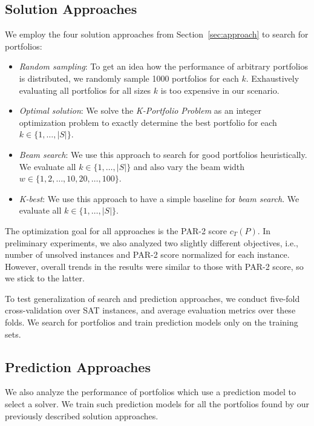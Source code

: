 \documentclass[conference]{IEEEtran}
\begin{document}
\subsection{Solution Approaches}

We employ the four solution approaches from Section~\ref{sec:approach} to search for portfolios:

\begin{itemize}
	\item \emph{Random sampling}:
	To get an idea how the performance of arbitrary portfolios is distributed, we randomly sample 1000 portfolios for each $k$.
	Exhaustively evaluating all portfolios for all sizes $k$ is too expensive in our scenario.
	\item \emph{Optimal solution}:
	We solve the \emph{K-Portfolio Problem} as an integer optimization problem to exactly determine the best portfolio for each $k \in \{1, \dots, |S|\}$.
	\item \emph{Beam search}: 
	We use this approach to search for good portfolios heuristically.
	We evaluate all $k \in \{1, \dots, |S|\}$ and also vary the beam width $w \in \{1, 2, \dots, 10, 20, \dots, 100\}$.
	\item \emph{K-best}:
	We use this approach to have a simple baseline for \emph{beam search}.
	We evaluate all $k \in \{1, \dots, |S|\}$.
\end{itemize}

The optimization goal for all approaches is the PAR-2 score $c_T(P)$.
In preliminary experiments, we also analyzed two slightly different objectives, i.e., number of unsolved instances and PAR-2 score normalized for each instance.
However, overall trends in the results were similar to those with PAR-2 score, so we stick to the latter.

To test generalization of search and prediction approaches, we conduct five-fold cross-validation over SAT instances, and average evaluation metrics over these folds. 
We search for portfolios and train prediction models only on the training sets.

\subsection{Prediction Approaches}

We also analyze the performance of portfolios which use a prediction model to select a solver. 
We train such prediction models for all the portfolios found by our previously described solution approaches. 
\end{document}
